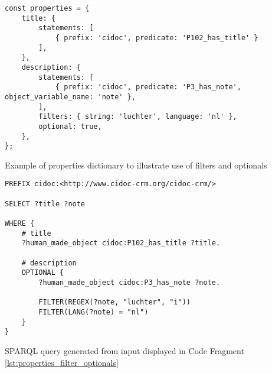 %


\begin{listing}[htbp]
    \begin{verbatim}
const properties = {
    title: {
        statements: [
            { prefix: 'cidoc', predicate: 'P102_has_title' }
        ],
    },
    description: {
        statements: [
            { prefix: 'cidoc', predicate: 'P3_has_note', object_variable_name: 'note' },
        ],
        filters: { string: 'luchter', language: 'nl' },
        optional: true,
    },
};
    \end{verbatim}
    \caption{Example of properties dictionary to illustrate use of filters and optionals}
    \label{lst:properties_filter_optionals}
\end{listing}
\begin{listing}[htbp]
    \begin{verbatim}
PREFIX cidoc:<http://www.cidoc-crm.org/cidoc-crm/>

SELECT ?title ?note

WHERE {
    # title
    ?human_made_object cidoc:P102_has_title ?title.
    
    # description
    OPTIONAL {
        ?human_made_object cidoc:P3_has_note ?note.
        
        FILTER(REGEX(?note, "luchter", "i"))
        FILTER(LANG(?note) = "nl")
    }
}
    \end{verbatim}
    \caption{SPARQL query generated from input displayed in Code Fragment \ref{lst:properties_filter_optionals}}
    \label{lst:query_generated_filters_optionals}
\end{listing}


